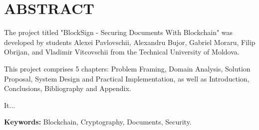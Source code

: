 \chapter*{ABSTRACT}
\thispagestyle{empty}

The project titled "BlockSign - Securing Documents With Blockchain" was developed by students Alexei Pavlovschii, Alexandru Bujor, Gabriel Moraru, Filip Obrijan, and Vladimir Vitcovschii from the Technical University of Moldova.

This project comprises 5 chapters: Problem Framing, Domain Analysis, Solution Proposal, System Design and Practical Implementation, as well as Introduction, Conclusions, Bibliography and Appendix.

It...

\textbf{Keywords: } Blockchain, Cryptography, Documents, Security.
